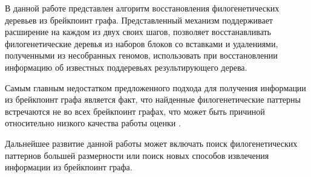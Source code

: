 \conclusion

В данной работе представлен алгоритм восстановления филогенетических деревьев из брейкпоинт графа.
Представленный механизм поддерживает расширение на каждом из двух своих шагов,
позволяет восстанавливать филогенетические деревья из наборов блоков со вставками и удалениями,
полученными из несобранных геномов, использовать при восстановлении информацию об известных поддеревьях результирующего дерева.

Самым главным недостатком предложенного подхода для получения информации из брейкпоинт графа является факт,
что найденные филогенетические паттерны встречаются не во всех брейкпоинт графах, что может быть причиной относительно низкого качества работы
оценки .

Дальнейшее развитие данной работы может включать поиск филогенетических паттернов большей размерности или поиск новых способов
извлечения информации из брейкпоинт графа.
